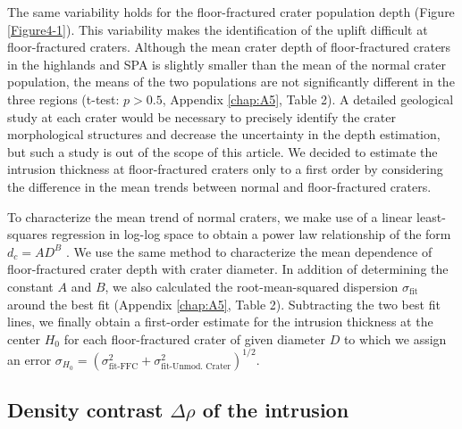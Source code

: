 The same  variability holds for the  floor-fractured crater population
depth   (Figure   \ref{Figure4-1}).    This  variability   makes   the
identification   of   the    uplift   difficult   at   floor-fractured
craters. Although the mean crater  depth of floor-fractured craters in
the highlands and SPA is slightly  smaller than the mean of the normal
crater  population,  the   means  of  the  two   populations  are  not
significantly  different  in  the  three regions  (t-test:  $p>  0.5$,
Appendix \ref{chap:A5}, Table 2).  A detailed geological study at each
crater   would  be   necessary  to   precisely  identify   the  crater
morphological  structures and  decrease the  uncertainty in  the depth
estimation, but such a study is out  of the scope of this article.  We
decided to estimate the intrusion thickness at floor-fractured craters
only to a first order by considering the difference in the mean trends
between normal and floor-fractured craters.

To characterize  the mean trend  of normal craters,  we make use  of a
linear least-squares regression in log-log space to obtain a power law
relationship of the form $d_c=AD^B$ \citep{Pike:1974ux,Kalynn:2013fg}.
We  use  the  same  method  to characterize  the  mean  dependence  of
floor-fractured  crater depth  with crater  diameter.  In  addition of
determining  the  constant  $A$  and   $B$,  we  also  calculated  the
root-mean-squared dispersion $\sigma_{\text{fit}}$ around the best fit
(Appendix  \ref{chap:A5},  Table 2).   Subtracting  the  two best  fit
lines,  we finally  obtain a  first-order estimate  for the  intrusion
thickness at the center $H_0$ for each floor-fractured crater of given
diameter     $D$      to     which     we     assign      an     error
$\sigma_{H_0}
=(\sigma_{\text{fit-FFC}}^2+\sigma_{\text{fit-Unmod. Crater}}^2)^{1/2}$.

\subsection{Density contrast $\Delta \rho$ of the intrusion}
\label{sec:intr-dens-contr}

